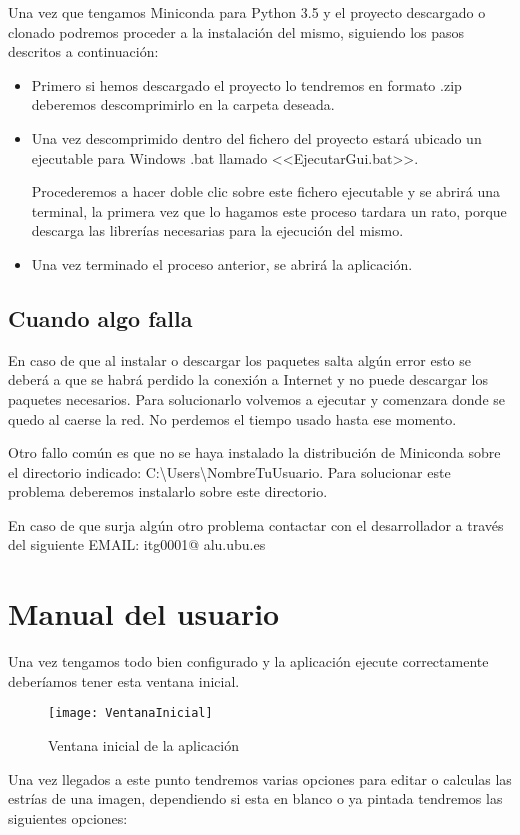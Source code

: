 Una vez que tengamos Miniconda para Python 3.5 y el proyecto descargado o clonado podremos proceder a la instalación del mismo, siguiendo los pasos descritos a continuación:

\begin{itemize}
	\item Primero si hemos descargado el proyecto lo tendremos en formato .zip deberemos descomprimirlo en la carpeta deseada.
	
	\item Una vez descomprimido dentro del fichero del proyecto estará ubicado un ejecutable para Windows .bat llamado <<EjecutarGui.bat>>.
	
	Procederemos a hacer doble clic sobre este fichero ejecutable y se abrirá una terminal, la primera vez que lo hagamos este proceso tardara un rato, porque descarga las librerías necesarias para la ejecución del mismo.
	
	\item Una vez terminado el proceso anterior, se abrirá la aplicación.
\end{itemize}

\subsection{Cuando algo falla}
En caso de que al instalar o descargar los paquetes salta algún error esto se deberá a que se habrá perdido la conexión a Internet y no puede descargar los paquetes necesarios.
Para solucionarlo volvemos a ejecutar y comenzara donde se quedo al caerse la red. No perdemos el tiempo usado hasta ese momento.

Otro fallo común es que no se haya instalado la distribución de Miniconda sobre el directorio indicado: C:\textbackslash Users\textbackslash NombreTuUsuario.
Para solucionar este problema deberemos instalarlo sobre este directorio.

En caso de que surja algún otro problema contactar con el desarrollador a través del siguiente EMAIL: itg0001\makeatletter @ alu.ubu.es 

\section{Manual del usuario}

Una vez tengamos todo bien configurado y la aplicación ejecute correctamente deberíamos tener esta ventana inicial.

\begin{figure}[h]
\centering
\texttt{[image: VentanaInicial]}
\caption{Ventana inicial de la aplicación}
\label{fig:E.1}
\end{figure}
Una vez llegados a este punto tendremos varias opciones para editar o calculas las estrías de una imagen, dependiendo si esta en blanco o ya pintada tendremos las siguientes opciones:


